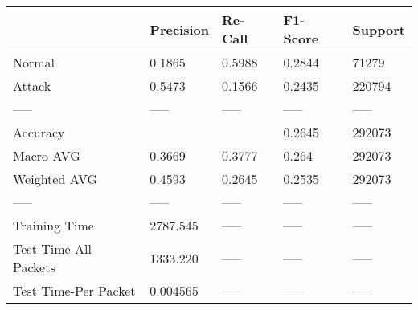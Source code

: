\begin{tabular}{lllll}
\toprule
{} & Precision & Re-Call & F1-Score & Support \\
\midrule
Normal                &    0.1865 &  0.5988 &   0.2844 &   71279 \\
Attack                &    0.5473 &  0.1566 &   0.2435 &  220794 \\
-----                 &     ----- &   ----- &    ----- &   ----- \\
Accuracy              &           &         &   0.2645 &  292073 \\
Macro AVG             &    0.3669 &  0.3777 &    0.264 &  292073 \\
Weighted AVG          &    0.4593 &  0.2645 &   0.2535 &  292073 \\
-----                 &     ----- &   ----- &    ----- &   ----- \\
Training Time         &  2787.545 &   ----- &    ----- &   ----- \\
Test Time-All Packets &  1333.220 &   ----- &    ----- &   ----- \\
Test Time-Per Packet  &  0.004565 &   ----- &    ----- &   ----- \\
\bottomrule
\end{tabular}
